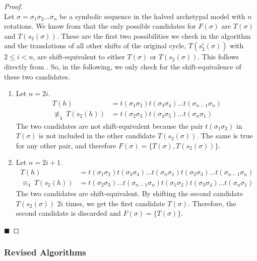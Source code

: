 \begin{proof} \phantom{x} \\
	Let $\sigma = \sigma_1\sigma_2 \dots \sigma_n$ be a symbolic sequence in the halved archetypal model with $n$ rotations.
	We know from  that the only possible candidates for $F(\sigma)$ are $T(\sigma)$ and $T(s_2(\sigma))$.
	These are the first two possibilities we check in the algorithm and the translations of all other shifts of the original cycle, $T(s_2^i(\sigma))$ with $2 \leq i < n$, are shift-equivalent to either $T(\sigma)$ or $T(s_2(\sigma))$.
	This follows directly from .
	So, in the following, we only check for the shift-equivalence of these two candidates.
	\begin{enumerate}
		\item Let $n = 2i$.
		      \begin{align*}
			      T(h)                   & = t(\sigma_1\sigma_2) t(\sigma_3\sigma_4) \dots t(\sigma_{n-1}\sigma_n) \\
			      \nequiv_4 \: T(s_2(h)) & = t(\sigma_2\sigma_3) t(\sigma_4\sigma_5) \dots t(\sigma_n\sigma_1)
		      \end{align*}
		      The two candidates are not shift-equivalent because the pair $t(\sigma_1\sigma_2)$ in $T(\sigma)$ is not included in the other candidate $T(s_2(\sigma))$.
		      The same is true for any other pair, and therefore $F(\sigma) = \{T(\sigma), T(s_2(\sigma))\}$.
		\item Let $n = 2i + 1$.
		      \begin{align*}
			      T(h)                  & = t(\sigma_1\sigma_2) t(\sigma_3\sigma_4) \dots t(\sigma_n\sigma_1) t(\sigma_2\sigma_3) \dots t(\sigma_{n-1}\sigma_n) \\
			      \equiv_4 \: T(s_2(h)) & = t(\sigma_2\sigma_3) \dots t(\sigma_{n-1}\sigma_n) t(\sigma_1\sigma_2) t(\sigma_3\sigma_4) \dots t(\sigma_n\sigma_1)
		      \end{align*}
		      The two candidates are shift-equivalent.
		      By shifting the second candidate $T(s_2(\sigma))$ $2i$ times, we get the first candidate $T(\sigma)$.
		      Therefore, the second candidate is discarded and $F(\sigma) = \{T(\sigma)\}$.
	\end{enumerate}
	\hfill $\blacksquare$
\end{proof}

\subsubsection{Revised Algorithms}


